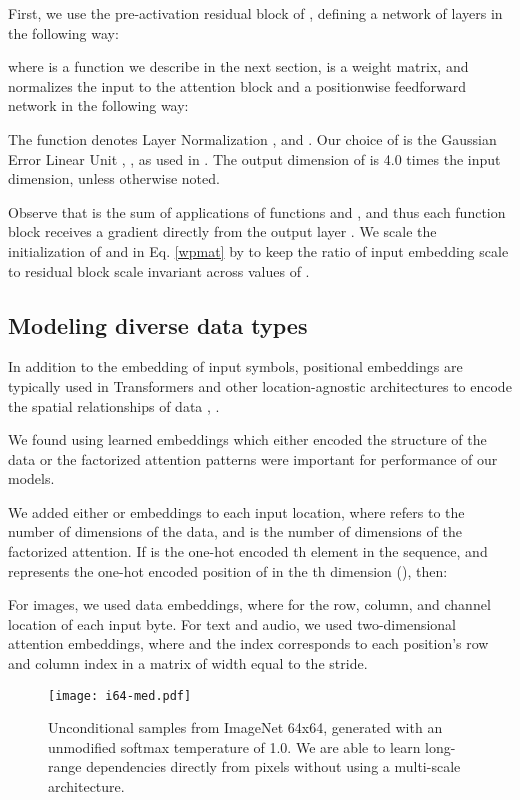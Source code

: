 \documentclass{article}
\begin{document}
First, we use the pre-activation residual block of \cite{He2016}, defining a network of  layers in the following way:



where  is a function we describe in the next section,  is a weight matrix, and  normalizes the input to the attention block and a positionwise feedforward network in the following way:




The  function denotes Layer Normalization \cite{ba2016layer}, and . Our choice of  is the Gaussian Error Linear Unit \cite{hendrycks2016bridging}, , as used in \cite{radford2018}. The output dimension of  is 4.0 times the input dimension, unless otherwise noted.

Observe that  is the sum of  applications of functions  and , and thus each function block receives a gradient directly from the output layer . We scale the initialization of  and  in Eq. \ref{wpmat} by  to keep the ratio of input embedding scale to residual block scale invariant across values of . 


\subsection{Modeling diverse data types}
In addition to the embedding of input symbols, positional embeddings are typically used in Transformers and other location-agnostic architectures to encode the spatial relationships of data \cite{gehring2017convolutional}, \cite{parmar2018image}.

We found using learned embeddings which either encoded the structure of the data or the factorized attention patterns were important for performance of our models. 

We added either  or  embeddings to each input location, where  refers to the number of dimensions of the data, and  is the number of dimensions of the factorized attention. If  is the one-hot encoded th element in the sequence, and  represents the one-hot encoded position of  in the th dimension (), then:




For images, we used data embeddings, where  for the row, column, and channel location of each input byte. For text and audio, we used two-dimensional attention embeddings, where  and the index corresponds to each position's row and column index in a matrix of width equal to the stride.

\begin{figure*}[t]
\centering
\setlength\fboxsep{0pt}
\setlength\fboxrule{0.25pt}
\texttt{[image: i64-med.pdf]}
\caption{Unconditional samples from ImageNet 64x64, generated with an unmodified softmax temperature of 1.0. We are able to learn long-range dependencies directly from pixels without using a multi-scale architecture.}
\label{inet64image}
\end{figure*}
\end{document}
